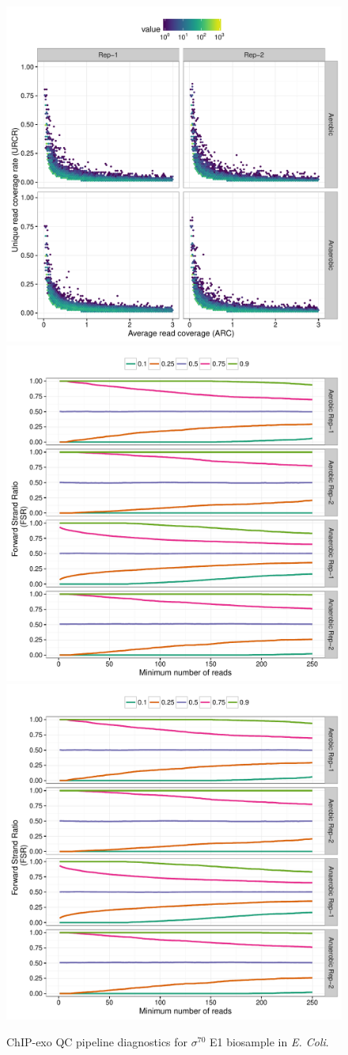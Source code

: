 \documentclass{article}
\begin{document}
\begin{figure}[H]
  \centering
  \includegraphics[width = .5\textwidth,page =
1]{figures/supplement/QC/Sig70_bios1_enrichment.pdf}\\
\includegraphics[width = .45\textwidth,page =
1]{figures/supplement/QC/Sig70_bios1_strand_imbalance.pdf}
\includegraphics[width = .45\textwidth,page =
3]{figures/supplement/QC/Sig70_bios1_strand_imbalance.pdf}
\caption{ChIP-exo QC pipeline diagnostics for $\sigma^{70}$ E1
  biosample in \emph{E. Coli}.}
  \label{sfig:qc1}
\end{figure}
\end{document}
